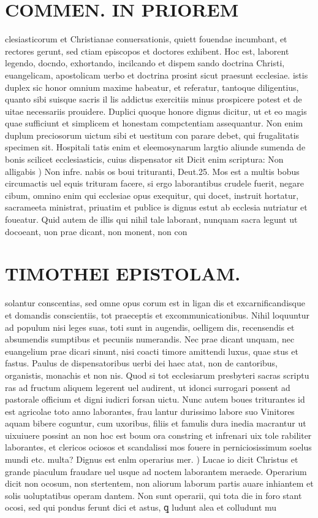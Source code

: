 \documentclass{article}
\begin{document}
\begin{pages}
\section*{COMMEN. IN PRIOREM }
\marginpar{[ p.138 ]}\pstart clesiasticorum et Christianae conuersationis, quiett fouendae incumbant, et rectores gerunt, sed ctiam episcopos et doctores exhibent. Hoc est, laborent legendo, docndo, exhortando, incilcando et dispem sando doctrina Christi, euangelicam, apostolicam uerbo et doctrina prosint sicut praesunt ecclesiae. istis duplex sic honor omnium maxime habeatur, et referatur, tantoque diligentius, quanto sibi suisque sacris il lis addictus exercitiis minus prospicere potest et de uitae necessariis prouidere. Duplici quoque honore dignus dicitur, ut et eo magis quae sufficiunt et simplicem et honestam compctentiam assequantur. Non enim duplum preciosorum uictum sibi et uestitum con parare debet, qui frugalitatis specimen sit. Hospitali tatis enim et eleemosynarum largtio aliunde sumenda de bonis scilicet ecclesiasticis, cuius dispensator sit  \pend\pstart Dicit enim scriptura: Non alligabis ) Non infre. nabis os boui trituranti, Deut.25. Mos est a multis bobus circumactis uel equis trituram facere, si ergo laborantibus crudele fuerit, negare cibum, omnino enim qui ecclesiae opus exequitur, qui docet, instruit hortatur, sacrameeta ministrat, priuatim et publice is dignus estut ab ecclesia nutriatur et foueatur. Quid autem de illis qui nihil tale laborant, nunquam sacra legunt ut docoeant, uon prae dicant, non monent, non con  \pend
\section*{TIMOTHEI EPISTOLAM. }
\marginpar{[ p.139 ]}\pstart solantur conscentias, sed omne opus corum est in ligan dis et excarnificandisque et domandis conscientiis, tot praeceptis et excommunicationibus. Nihil loquuntur ad populum nisi leges suas, toti sunt in augendis, oelligem dis, recensendis et absumendis sumptibus et pecuniis numerandis. Nec prae dicant unquam, nec euangelium prae dicari sinunt, nisi coacti timore amittendi luxus, quae stus et fastus. Paulus de dispensatoribus uerbi dei haec atat, non de cantoribus, organistis, monachis et non nis. Quod si tot ecclesiarum presbyteri sacras scriptu ras ad fructum aliquem legerent uel audirent, ut idonci surrogari possent ad pastorale officium et digni iudicri forsan uictu. Nunc autem boues triturantes id est agricolae toto anno laborantes, frau lantur durissimo labore suo Vinitores aquam bibere coguntur, cum uxoribus, filiis et famulis dura inedia macrantur ut uixuiuere possint an non hoc est boum ora constring et infrenari uix tole rabiliter laborantes, et clericos ociosos et scandalissi mos fouere in perniciosissimum soelus mundi etc. multa?  \pend\pstart Dignus est enlm operarius mer. ) Lucae io dicit Christus et grande piaculum fraudare uel usque ad noctem laborantem meraede. Operarium dicit non ocosum, non stertentem, non aliorum laborum partis auare inhiantem et solis uoluptatibus operam dantem. Non sunt operarii, qui tota die in foro stant ocosi, sed qui pondus ferunt dici et astus, ꝗ ludunt alea et colludunt mu  \pend

\end{pages}
\end{document}
